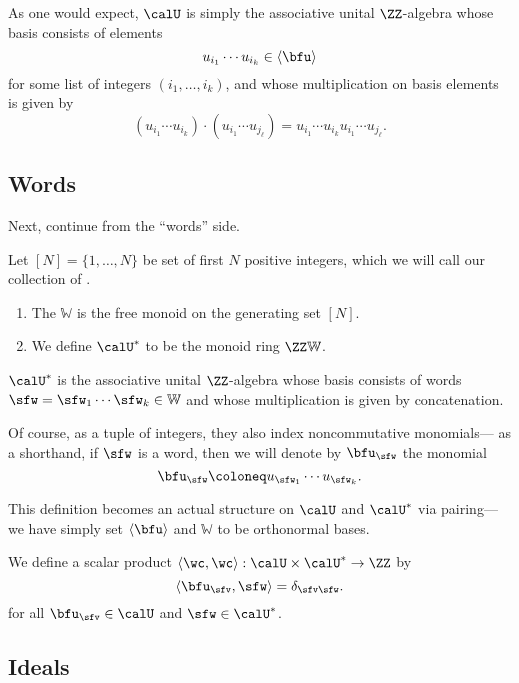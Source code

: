 \documentclass{article}
\newcommand{\ip}[1]{
    \left\langle
        {#1}
    \right\rangle
}
\newcommand*\WW{\mathbb{W}}
\begin{document}
As one would expect, $\calU$ is simply the associative unital $\ZZ$-algebra whose basis consists of elements
\[
    u_{i_1} \cdots u_{i_k} \in \langle \bfu \rangle
\]
for some list of integers $(i_1,\ldots,i_k)$, and whose multiplication on basis elements is given by
\[
    (u_{i_1} \cdots u_{i_k}) \cdot (u_{i_1} \cdots u_{j_\ell})
    =
    u_{i_1} \cdots u_{i_k} u_{i_1} \cdots u_{j_\ell}.
\]
\subsection{Words}

Next, continue from the ``words'' side.

\begin{definition}
    Let $[N] = \{1,\ldots,N\}$ be set of first $N$ positive integers, which we will call our collection of .
    \begin{enumerate}[label=(\alph*)]
        \item 
            The  $\mathbb{W}$ is the free monoid on the generating set $[N]$.
        \item 
            We define $\calU^\ast$ to be the monoid ring $\ZZ\mathbb{W}$.
    \end{enumerate}
\end{definition}

$\calU^\ast$ is the associative unital $\ZZ$-algebra whose basis consists of words $\sfw = \sfw_1\cdots\sfw_k \in \WW$ and whose multiplication is given by concatenation.

Of course, as a tuple of integers, they also index noncommutative monomials--- as a shorthand, if $\sfw$ is a word, then we will denote by $\bfu_\sfw$ the monomial
\[
    \bfu_\sfw
    \coloneq
    u_{\sfw_1} \cdots u_{\sfw_k}.
\]

This definition becomes an actual structure on $\calU$ and $\calU^\ast$ via pairing--- we have simply set $\langle \bfu \rangle$ and $\WW$ to be orthonormal bases.

\begin{definition}
    We define a scalar product $\ip{\wc,\wc}: \calU \times \calU^\ast \to \ZZ$ by
    \[
        \ip{\bfu_\sfv, \sfw} 
        = 
        \delta_{\sfv\sfw}.
    \]
    for all $\bfu_\sfv \in \calU$ and $\sfw \in \calU^\ast$.
\end{definition}

\subsection{Ideals}
\end{document}
